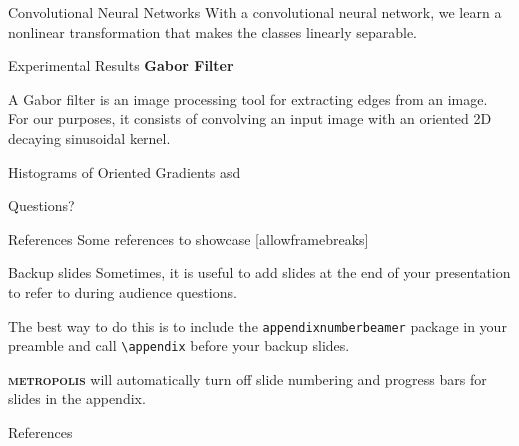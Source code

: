 \documentclass[10pt]{beamer}
\newcommand{\themename}{\textbf{\textsc{metropolis}}\xspace}
\begin{document}
\begin{frame}{Convolutional Neural Networks}
	With a convolutional neural network, we learn a nonlinear transformation that makes the classes linearly separable. 
\end{frame}


\begin{frame}{Experimental Results}
\textbf{Gabor Filter}

A Gabor filter is an image processing tool for extracting edges from an image. For our purposes, it consists of convolving an input image with an oriented 2D decaying sinusoidal kernel.



\end{frame}


\begin{frame}{Histograms of Oriented Gradients}
asd
\end{frame}

\begin{frame}[standout]
  Questions?
\end{frame}


\begin{frame}{References}
  Some references to showcase [allowframebreaks] \cite{knuth92,ConcreteMath,Simpson,Er01,greenwade93}
\end{frame}


\appendix

\begin{frame}[fragile]{Backup slides}
  Sometimes, it is useful to add slides at the end of your presentation to
  refer to during audience questions.

  The best way to do this is to include the \verb|appendixnumberbeamer|
  package in your preamble and call \verb|\appendix| before your backup slides.

  \themename will automatically turn off slide numbering and progress bars for
  slides in the appendix.
\end{frame}

\begin{frame}[allowframebreaks]{References}

  
  

\end{frame}
\end{document}
